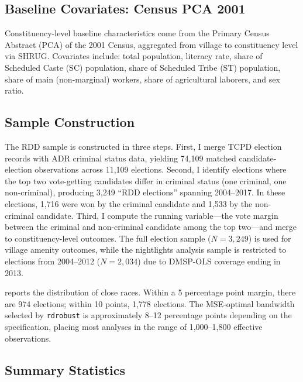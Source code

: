 \documentclass[12pt]{article}
\begin{document}
\subsection{Baseline Covariates: Census PCA 2001}

Constituency-level baseline characteristics come from the Primary Census Abstract (PCA) of the 2001 Census, aggregated from village to constituency level via SHRUG. Covariates include: total population, literacy rate, share of Scheduled Caste (SC) population, share of Scheduled Tribe (ST) population, share of main (non-marginal) workers, share of agricultural laborers, and sex ratio.

\subsection{Sample Construction}

The RDD sample is constructed in three steps. First, I merge TCPD election records with ADR criminal status data, yielding 74,109 matched candidate-election observations across 11,109 elections. Second, I identify elections where the top two vote-getting candidates differ in criminal status (one criminal, one non-criminal), producing 3,249 ``RDD elections'' spanning 2004--2017. In these elections, 1,716 were won by the criminal candidate and 1,533 by the non-criminal candidate. Third, I compute the running variable---the vote margin between the criminal and non-criminal candidate among the top two---and merge to constituency-level outcomes. The full election sample ($N = 3{,}249$) is used for village amenity outcomes, while the nightlights analysis sample is restricted to elections from 2004--2012 ($N = 2{,}034$) due to DMSP-OLS coverage ending in 2013.

 reports the distribution of close races. Within a 5 percentage point margin, there are 974 elections; within 10 points, 1,778 elections. The MSE-optimal bandwidth selected by \texttt{rdrobust} is approximately 8--12 percentage points depending on the specification, placing most analyses in the range of 1,000--1,800 effective observations.

\subsection{Summary Statistics}
\end{document}
